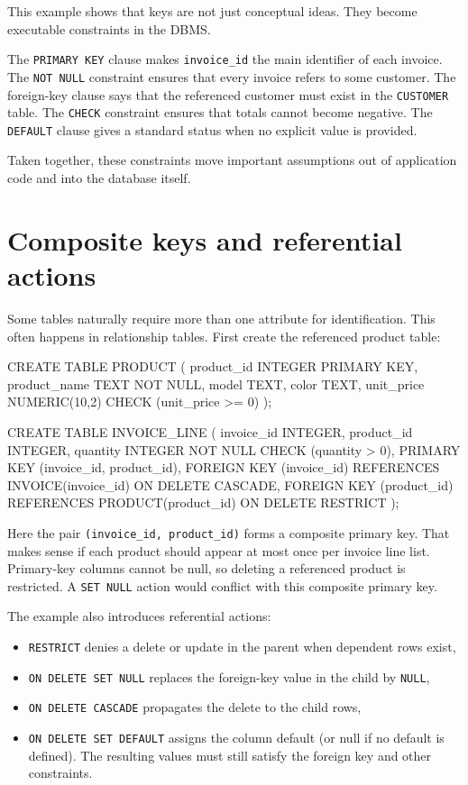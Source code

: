 \documentclass[11pt,a4paper,openany]{book}
\begin{document}
This example shows that keys are not just conceptual ideas. They become executable constraints in the DBMS.

The \texttt{PRIMARY KEY} clause makes \texttt{invoice\_id} the main identifier of each invoice. The \texttt{NOT NULL} constraint ensures that every invoice refers to some customer. The foreign-key clause says that the referenced customer must exist in the \texttt{CUSTOMER} table. The \texttt{CHECK} constraint ensures that totals cannot become negative. The \texttt{DEFAULT} clause gives a standard status when no explicit value is provided.

Taken together, these constraints move important assumptions out of application code and into the database itself.

\section{Composite keys and referential actions}
Some tables naturally require more than one attribute for identification. This often happens in relationship tables. First create the referenced product table:

\begin{codesql}
CREATE TABLE PRODUCT (
  product_id   INTEGER PRIMARY KEY,
  product_name TEXT NOT NULL,
  model        TEXT,
  color        TEXT,
  unit_price   NUMERIC(10,2) CHECK (unit_price >= 0)
);
\end{codesql}

\begin{codesql}
CREATE TABLE INVOICE_LINE (
  invoice_id  INTEGER,
  product_id  INTEGER,
  quantity    INTEGER NOT NULL CHECK (quantity > 0),
  PRIMARY KEY (invoice_id, product_id),
  FOREIGN KEY (invoice_id) REFERENCES INVOICE(invoice_id) ON DELETE CASCADE,
  FOREIGN KEY (product_id) REFERENCES PRODUCT(product_id) ON DELETE RESTRICT
);
\end{codesql}

Here the pair \texttt{(invoice\_id, product\_id)} forms a composite primary key. That makes sense if each product should appear at most once per invoice line list. Primary-key columns cannot be null, so deleting a referenced product is restricted. A \texttt{SET NULL} action would conflict with this composite primary key.

The example also introduces referential actions:
\begin{itemize}
\item \texttt{RESTRICT} denies a delete or update in the parent when dependent rows exist,
\item \texttt{ON DELETE SET NULL} replaces the foreign-key value in the child by \texttt{NULL},
\item \texttt{ON DELETE CASCADE} propagates the delete to the child rows,
\item \texttt{ON DELETE SET DEFAULT} assigns the column default (or null if no default is defined). The resulting values must still satisfy the foreign key and other constraints.
\end{itemize}
\end{document}
